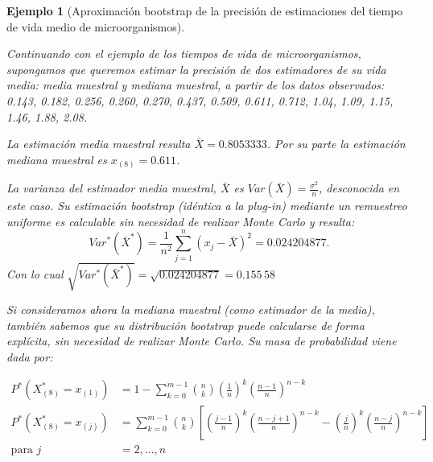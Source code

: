 \documentclass[
]{book}
\theoremstyle{break}
\newtheorem{example}{Ejemplo}[chapter]
\theoremstyle{nonumberplain}
\begin{document}
\begin{example}[Aproximación bootstrap de la precisión de estimaciones del tiempo de vida medio de microorganismos]
\protect\hypertarget{exm:estimacion-boot-precision}{}\label{exm:estimacion-boot-precision}

\vspace{0.5cm}

Continuando con el ejemplo de los tiempos de vida de microorganismos,
supongamos que queremos estimar
la precisión de dos estimadores de su vida media: media muestral y
mediana muestral, a partir de los datos observados: 0.143, 0.182, 0.256, 0.260, 0.270,
0.437, 0.509, 0.611, 0.712, 1.04, 1.09, 1.15, 1.46, 1.88, 2.08.

La estimación media muestral resulta \(\bar{X}=0.8053333\). Por su
parte la estimación mediana muestral es \(x_{\left( 8 \right)}=0.611\).

La varianza del estimador media muestral, \(\bar{X}\) es \(Var\left(
\bar{X} \right) =\frac{\sigma^2}{n}\), desconocida en este caso.
Su estimación bootstrap (idéntica a la plug-in) mediante un remuestreo
uniforme es calculable sin necesidad de realizar Monte Carlo y
resulta:
\[Var^{\ast}\left( \bar{X}^{\ast} \right) =\frac{1}{n^2}
\sum_{j=1}^{n}\left( x_j-\bar{X} \right)^2=0.024204877.\]
Con lo cual \(\sqrt{Var^{\ast}\left( \bar{X}^{\ast} \right)}=\sqrt{
0.024204877}= 0.155\,58\)

Si consideramos ahora la mediana muestral (como estimador de la media),
también sabemos que su distribución bootstrap puede calcularse de forma
explícita, sin necesidad de realizar Monte Carlo. Su masa de
probabilidad viene dada por:

\[\begin{aligned}
P^{\ast}\left( X_{\left( 8 \right)}^{\ast}=x_{(1)} \right)
&= 1-\sum_{k=0}^{m-1}\binom{n}{k}\left( \frac{1}{n} \right)^{k}\left( \frac{
n-1}{n} \right)^{n-k} \\
P^{\ast}\left( X_{\left( 8 \right)}^{\ast}=x_{(j)} \right)
&= \sum_{k=0}^{m-1}\binom{n}{k}\left[ \left( \frac{j-1}{n} \right)^{k}\left( 
\frac{n-j+1}{n} \right)^{n-k} - \left( \frac{j}{n} \right)^{k}\left( \frac{n-j}{n} \right)^{n-k}
\right] \\
\text{para }j &= 2,\ldots ,n
\end{aligned}\]


\end{example}
\end{document}
